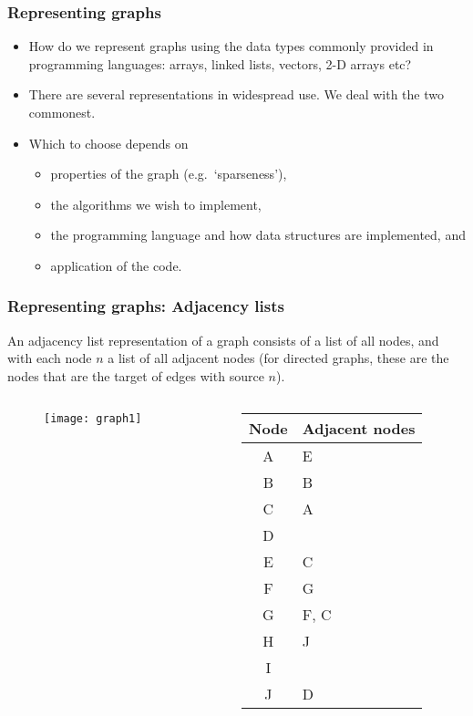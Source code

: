    \begin{frame}[fragile]
\frametitle{Representing graphs}

\begin{itemize}
\item How do we represent graphs using the data types commonly provided in programming languages:
arrays, linked lists, vectors, 2-D arrays etc?

\item There are several representations in widespread use. We deal with the two commonest. 

\item Which to choose depends on
\begin{itemize}
\item properties of the graph (e.g.~`sparseness'), 
\item the algorithms we wish to implement, 
\item the programming language and how data structures are implemented, and
\item application of the code.
\end{itemize}
\end{itemize}
\end{frame}

   \begin{frame}[fragile]
\frametitle{Representing graphs: Adjacency lists}

An \color{blue}adjacency list \color{black} representation of a graph 
consists of a list of all nodes, and with each node
$n$ a list of all adjacent nodes (for directed graphs, these are the nodes 
that are the target of edges with source $n$).

  \begin{columns}
    \begin{column}{0.5\linewidth}
    
    \begin{figure} [ht]
    \centering
    \texttt{[image: graph1]}
    \end{figure}
	\end{column}
	    \begin{column}{0.5\linewidth}
	
{\scriptsize
\begin{tabular}{c|l}
Node & Adjacent nodes \\
\hline 
A & E\\
B & B \\
C & A \\
D & \\
E & C \\
F & G \\
G & F, C \\
H & J \\
I & \\
J & D 
\end{tabular}

}
	\end{column}
  \end{columns}
\end{frame}


